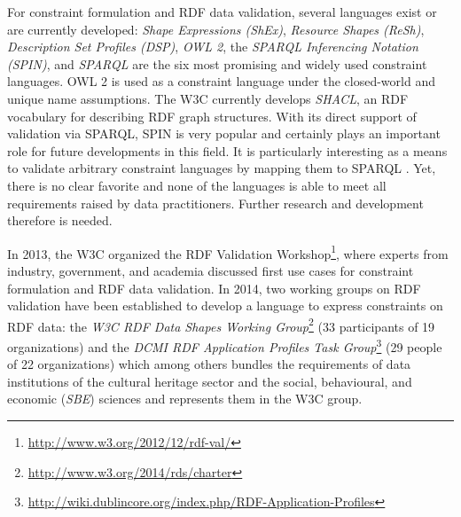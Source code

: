 \documentclass[conference]{IEEEtran}
\begin{document}
 


For constraint formulation and RDF data validation, several languages exist or are currently developed: \emph{Shape Expressions (ShEx)}, \emph{Resource Shapes (ReSh)}, \emph{Description Set Profiles (DSP)}, \emph{OWL 2}, the \emph{SPARQL Inferencing Notation (SPIN)}, and \emph{SPARQL} are the six most promising and widely used constraint languages. OWL 2 is used as a constraint language under the closed-world and unique name assumptions. The W3C currently develops \emph{SHACL}, an RDF vocabulary for describing RDF graph structures. With its direct support of validation via SPARQL, SPIN is very popular and certainly plays an important role for future developments in this field. It is particularly interesting as a means to validate arbitrary constraint languages by mapping them to SPARQL \cite{BoschEckert2014-2}. Yet, there is no clear favorite and none of the languages is able to meet all requirements raised by data practitioners. Further research and development therefore is needed.

In 2013, the W3C organized the RDF Validation Workshop\footnote{\url{http://www.w3.org/2012/12/rdf-val/}}, 
where experts from industry, government, and academia discussed first use cases for constraint formulation and RDF data validation.
In 2014, two working groups on RDF validation have been established to develop a language to express constraints on RDF data: 
the \emph{W3C RDF Data Shapes Working Group}\footnote{\url{http://www.w3.org/2014/rds/charter}} (33 participants of 19 organizations) and the \emph{DCMI RDF Application Profiles Task Group}\footnote{\url{http://wiki.dublincore.org/index.php/RDF-Application-Profiles}} (29 people of 22 organizations) which among others bundles the requirements of data institutions of the cultural heritage sector and the social, behavioural, and economic (\emph{SBE}) sciences and represents them in the W3C group. 
\end{document}
